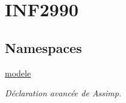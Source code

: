 \hypertarget{group__inf2990}{}\section{I\+N\+F2990}
\label{group__inf2990}
\subsection*{Namespaces}
\begin{DoxyCompactItemize}
\item 
 \hyperlink{namespacemodele}{modele}
\begin{DoxyCompactList}\small\item\em Déclaration avancée de Assimp. \end{DoxyCompactList}\end{DoxyCompactItemize}
